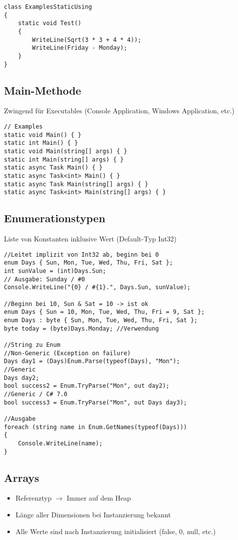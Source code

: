 \begin{multicols*}{2}
\begin{lstlisting}
class ExamplesStaticUsing
{
    static void Test() 
    {
        WriteLine(Sqrt(3 * 3 + 4 * 4));
        WriteLine(Friday - Monday);
    } 
}
\end{lstlisting}

\subsection{Main-Methode}
Zwingend für Executables (Console Application, Windows Application, etc.)
\begin{lstlisting}
// Examples
static void Main() { }
static int Main() { }
static void Main(string[] args) { }
static int Main(string[] args) { }
static async Task Main() { }
static async Task<int> Main() { }
static async Task Main(string[] args) { }
static async Task<int> Main(string[] args) { }
\end{lstlisting}

\subsection{Enumerationstypen}
Liste von Konstanten inklusive Wert (Default-Typ Int32)
\begin{lstlisting}
//Leitet implizit von Int32 ab, beginn bei 0
enum Days { Sun, Mon, Tue, Wed, Thu, Fri, Sat };
int sunValue = (int)Days.Sun;
// Ausgabe: Sunday / #0
Console.WriteLine("{0} / #{1}.", Days.Sun, sunValue); 

//Beginn bei 10, Sun & Sat = 10 -> ist ok
enum Days { Sun = 10, Mon, Tue, Wed, Thu, Fri = 9, Sat };
enum Days : byte { Sun, Mon, Tue, Wed, Thu, Fri, Sat };
byte today = (byte)Days.Monday; //Verwendung

//String zu Enum
//Non-Generic (Exception on failure)
Days day1 = (Days)Enum.Parse(typeof(Days), "Mon"); 
//Generic
Days day2;
bool success2 = Enum.TryParse("Mon", out day2);
//Generic / C# 7.0
bool success3 = Enum.TryParse("Mon", out Days day3); 

//Ausgabe
foreach (string name in Enum.GetNames(typeof(Days))) 
{
    Console.WriteLine(name);
}
\end{lstlisting}

\subsection{Arrays}
\begin{itemize}
    \item Referenztyp $\rightarrow$ Immer auf dem Heap
    \item Länge aller Dimensionen bei Instanzierung bekannt
    \item Alle Werte sind nach Instanzierung initialisiert (false, 0, null, etc.)
\end{itemize}

\end{multicols*}
